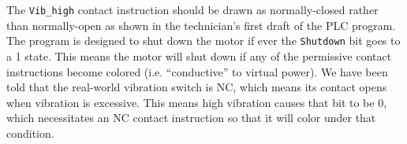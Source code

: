 





The {\tt Vib\_high} contact instruction should be drawn as normally-closed rather than normally-open as shown in the technician's first draft of the PLC program.  The program is designed to shut down the motor if ever the {\tt Shutdown} bit goes to a 1 state.  This means the motor will shut down if any of the permissive contact instructions become colored (i.e. ``conductive'' to virtual power).  We have been told that the real-world vibration switch is NC, which means its contact opens when vibration is excessive.  This means high vibration causes that bit to be 0, which necessitates an NC contact instruction so that it will color under that condition.











